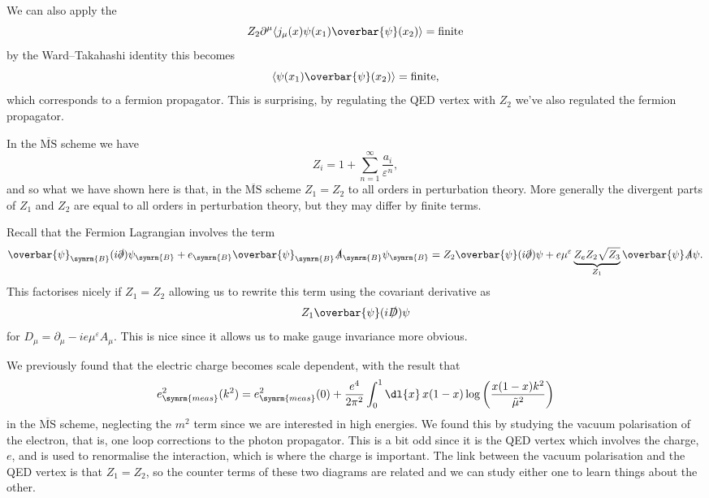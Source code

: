 \documentclass[fleqn]{NotesClass}
\newcommand{\MSbar}{\ensuremath{\overline{\text{MS}}}}
\newcommand{\diracadjoint}[1]{\overbar{#1}}
\newcommand{\covariantDerivative}{D}
\DeclarePairedDelimiter{\correlator}{\langle}{\rangle}
\newcommand{\bare}{\symrm{B}}
\newcommand{\measured}{\symrm{meas}}
\begin{document}
    We can also apply the 
    \begin{equation}
        Z_2\partial^\mu\correlator{j_\mu(x) \psi(x_1) \diracadjoint{\psi}(x_2)} = \text{finite}
    \end{equation}
    by the Ward--Takahashi identity this becomes
    \begin{equation}
        \correlator{\psi(x_1) \diracadjoint{\psi}(x_2)} = \text{finite},
    \end{equation}
    which corresponds to a fermion propagator.
    This is surprising, by regulating the QED vertex with \(Z_2\) we've also regulated the fermion propagator.
    
    In the \MSbar{} scheme we have
    \begin{equation}
        Z_i = 1 + \sum_{n = 1}^{\infty} \frac{a_i}{\varepsilon^n},
    \end{equation}
    and so what we have shown here is that, in the \MSbar{} scheme \(Z_1 = Z_2\) to all orders in perturbation theory.
    More generally the divergent parts of \(Z_1\) and \(Z_2\) are equal to all orders in perturbation theory, but they may differ by finite terms.
    
    Recall that the Fermion Lagrangian involves the term
    \begin{equation}
        \diracadjoint{\psi}_{\bare}(i\slashed{\partial})\psi_{\bare} + e_{\bare}\diracadjoint{\psi}_{\bare}\slashed{A}_{\bare}\psi_{\bare} = Z_2\diracadjoint{\psi}(i\slashed{\partial})\psi + e\mu^\varepsilon \underbrace{Z_eZ_2\sqrt{Z_3}}_{Z_1} \diracadjoint{\psi}\slashed{A}\psi.
    \end{equation}
    This factorises nicely if \(Z_1 = Z_2\) allowing us to rewrite this term using the covariant derivative as
    \begin{equation}
        Z_1\diracadjoint{\psi}(i\slashed{\covariantDerivative})\psi
    \end{equation}
    for \(\covariantDerivative_\mu = \partial_\mu - ie\mu^\varepsilon A_\mu\).
    This is nice since it allows us to make gauge invariance more obvious.
    
    We previously found that the electric charge becomes scale dependent, with the result that
    \begin{equation}
        e_{\measured}^2(k^2) = e_{\measured}^2(0) + \frac{e^4}{2\pi^2} \int_0^1 \dl{x} \, x(1 - x) \log\left( \frac{x(1 - x)k^2}{\tilde{\mu}^2} \right)
    \end{equation}
    in the \MSbar{} scheme, neglecting the \(m^2\) term since we are interested in high energies.
    We found this by studying the vacuum polarisation of the electron, that is, one loop corrections to the photon propagator.
    This is a bit odd since it is the QED vertex which involves the charge, \(e\), and is used to renormalise the interaction, which is where the charge is important.
    The link between the vacuum polarisation and the QED vertex is that \(Z_1 = Z_2\), so the counter terms of these two diagrams are related and we can study either one to learn things about the other.
    
\end{document}
